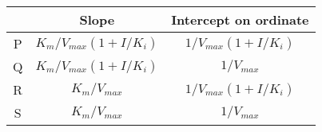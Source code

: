 \begin{tabular}{|c|c|c|}
    \hline
     & Slope & Intercept on ordinate \\
    \hline                                                       
    P & $K_m/V_{max}(1+I/K_i)$ & $1/V_{max}(1+I/K_i)$ \\
    \hline
    Q & $K_m/V_{max}(1+I/K_i)$ & $1/V_{max}$ \\
    \hline
    R & $K_m/V_{max}$ & $1/V_{max}(1+I/K_i)$ \\
    \hline
    S & $K_m/V_{max}$ & $1/V_{max}$ \\
    \hline
\end{tabular}

